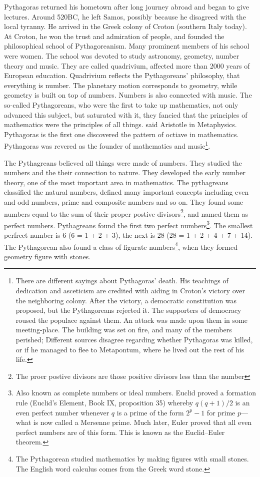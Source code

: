 \documentclass{article}
\begin{document}
Pythagoras returned his hometown after long journey abroad and began to give lectures. Around 520BC, he left Samos, possibly because he disagreed with the local tyranny. He arrived in the Greek colony of Croton (southern Italy today). At Croton, he won the trust and admiration of people, and founded the philosophical school of Pythagoreanism. Many prominent members of his school were women. The school was devoted to study astronomy, geometry, number theory and music. They are called quadrivium, affected more than 2000 years of European education\cite{StepanovRose15}. Quadrivium reflects the Pythagoreans' philosophy, that everything is number. The planetary motion corresponds to geometry, while geometry is built on top of numbers. Numbers is also connected with music. The so-called Pythagoreans, who were the first to take up mathematics, not only advanced this subject, but saturated with it, they fancied that the principles of mathematics were the principles of all things. said Aristotle in Metaphysics. Pythagoras is the first one discovered the pattern of octiave in mathematics. Pythagoras was revered as the founder of mathematics and music\footnote{There are different sayings about Pythagoras' death. His teachings of dedication and asceticism are credited with aiding in Croton's victory over the neighboring colony. After the victory, a democratic constitution was proposed, but the Pythagoreans rejected it. The supporters of democracy roused the populace against them. An attack was made upon them in some meeting-place. The building was set on fire, and many of the members perished; Different sources disagree regarding whether Pythagoras was killed, or if he managed to flee to Metapontum, where he lived out the rest of his life.}.

The Pythagreans believed all things were made of numbers. They studied the numbers and the their connection to nature. They developed the early number theory, one of the most important area in mathematics. The pythagreans classified the natural numbers, defined many important concepts including even and odd numbers, prime and composite numbers and so on. They found some numbers equal to the sum of their proper postive divisors\footnote{The proer postive divisors are those positive divisors less than the number}, and named them as perfect numbers. Pythagreans found the first two perfect numbers\footnote{Also known as complete numbers or ideal numbers. Euclid proved a formation rule (Euclid's Element, Book IX, proposition 35) whereby $q(q+1)/2$ is an even perfect number whenever $q$ is a prime of the form $2^p-1$ for prime $p$—what is now called a Mersenne prime. Much later, Euler proved that all even perfect numbers are of this form. This is known as the Euclid–Euler theorem.}. The smallest perfrect number is 6 (6 = 1 + 2 + 3), the next is 28 (28 = 1 + 2 + 4 + 7 + 14). The Pythagorean also found a class of figurate numbers\footnote{The Pythagorean studied mathematics by making figures with small stones. The English word calculus comes from the Greek word stone\cite{HanXueTao16}.}, when they formed geometry figure with stones.
\end{document}
